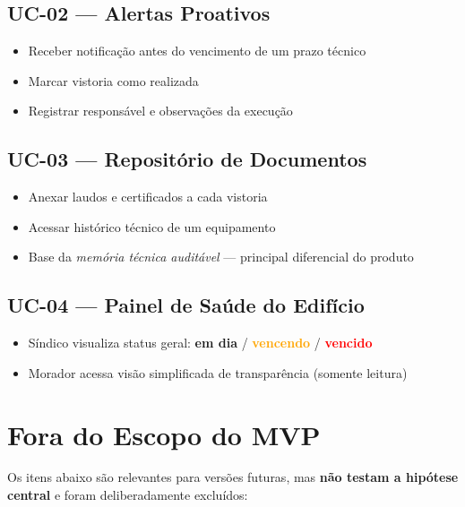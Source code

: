 \documentclass[12pt, a4paper]{article}
\begin{document}
\subsection{UC-02 — Alertas Proativos}

\begin{itemize}[leftmargin=1.5em]
    \item Receber notificação antes do vencimento de um prazo técnico
    \item Marcar vistoria como realizada
    \item Registrar responsável e observações da execução
\end{itemize}

\subsection{UC-03 — Repositório de Documentos}

\begin{itemize}[leftmargin=1.5em]
    \item Anexar laudos e certificados a cada vistoria
    \item Acessar histórico técnico de um equipamento
    \item Base da \textit{memória técnica auditável} — principal diferencial do produto
\end{itemize}

\subsection{UC-04 — Painel de Saúde do Edifício}

\begin{itemize}[leftmargin=1.5em]
    \item Síndico visualiza status geral: \textcolor{green!60!black}{\textbf{em dia}} /
    \textcolor{orange}{\textbf{vencendo}} / \textcolor{red}{\textbf{vencido}}
    \item Morador acessa visão simplificada de transparência (somente leitura)
\end{itemize}

\vspace{0.5cm}

\section{Fora do Escopo do MVP}

Os itens abaixo são relevantes para versões futuras, mas \textbf{não testam a hipótese
central} e foram deliberadamente excluídos:
\end{document}
